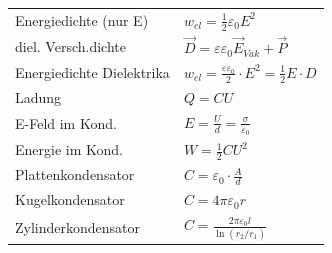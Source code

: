 \documentclass[12pt,a4paper]{article}
\renewcommand{\=}[1]{\stackrel{#1}{=}}
\theoremstyle{definition}
\theoremstyle{remark}
\begin{document}
\begin{center}
\begin{minipage}[t]{.5\linewidth}
\begin{tabular}{ll}
\end{tabular}
\end{minipage}
\end{center}

\begin{center}
\begin{minipage}[t]{.5\linewidth}
\vspace{0pt}
\noindent\begin{tabular}{ll}
Energiedichte (nur E) &  $w_{el} = \frac{1}{2} \varepsilon_0 E^2$\\
diel. Versch.dichte &  $\vec{D} = \varepsilon \varepsilon_0 \vec{E}_{Vak} + \vec{P}$\\
Energiedichte Dielektrika & $w_{el} = \frac{\varepsilon \varepsilon_0}{2} \cdot E^2 = \frac{1}{2} E \cdot D$\\
Ladung & $Q = C U$\\
E-Feld im Kond. &  $E = \frac{U}{d} = \frac{\sigma}{\varepsilon_0}$\\
Energie im Kond. & $W = \frac{1}{2} C U^2$\\
Plattenkondensator & $C = \varepsilon_0 \cdot \frac{A}{d}$\\
Kugelkondensator & $C = 4\pi\varepsilon_0 r$\\
Zylinderkondensator & $C = \frac{2\pi\varepsilon_0 l}{\ln(r_2/r_1)}$\\
\end{tabular}
\end{minipage}%
\begin{minipage}[t]{.5\linewidth}
\vspace{0pt}
\begin{tabular}{ll}

\end{tabular}
\end{minipage}
\end{center}
\end{document}
